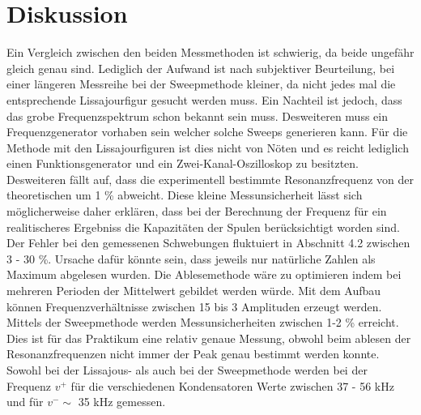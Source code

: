 \section{Diskussion}
\label{sec:Diskussion}
Ein Vergleich zwischen den beiden Messmethoden ist schwierig, da beide ungefähr gleich genau sind. Lediglich der Aufwand ist nach subjektiver Beurteilung, bei einer längeren Messreihe bei der Sweepmethode kleiner, da nicht jedes mal die entsprechende Lissajourfigur gesucht werden muss. Ein Nachteil ist jedoch, dass das grobe Frequenzspektrum schon bekannt sein muss. Desweiteren muss ein Frequenzgenerator vorhaben sein welcher solche Sweeps generieren kann. Für die Methode mit den Lissajourfiguren ist dies nicht von Nöten und es reicht lediglich einen Funktionsgenerator und ein Zwei-Kanal-Oszilloskop zu besitzten.\\
Desweiteren fällt auf, dass die experimentell bestimmte Resonanzfrequenz von der theoretischen um 1 \% abweicht. Diese kleine Messunsicherheit lässt sich möglicherweise daher erklären, dass bei der Berechnung der Frequenz für ein realitischeres Ergebniss die Kapazitäten der Spulen berücksichtigt worden sind. \\
Der Fehler bei den gemessenen Schwebungen fluktuiert in Abschnitt 4.2 zwischen 3 - 30 \%. Ursache dafür könnte sein, dass jeweils nur natürliche Zahlen als Maximum abgelesen wurden. Die Ablesemethode wäre zu optimieren indem bei mehreren Perioden der Mittelwert gebildet werden würde. Mit dem Aufbau können Frequenzverhältnisse zwischen 15 bis 3 Amplituden erzeugt werden.\\
Mittels der Sweepmethode werden Messunsicherheiten zwischen 1-2 \% erreicht. Dies ist für das Praktikum eine relativ genaue Messung, obwohl beim ablesen der Resonanzfrequenzen nicht immer der Peak genau bestimmt werden konnte. \\
Sowohl bei der Lissajous- als auch bei der Sweepmethode werden bei der Frequenz $v^+$ für die verschiedenen Kondensatoren Werte zwischen 37 - 56 kHz und für $v^- \sim$ 35 kHz gemessen. 
